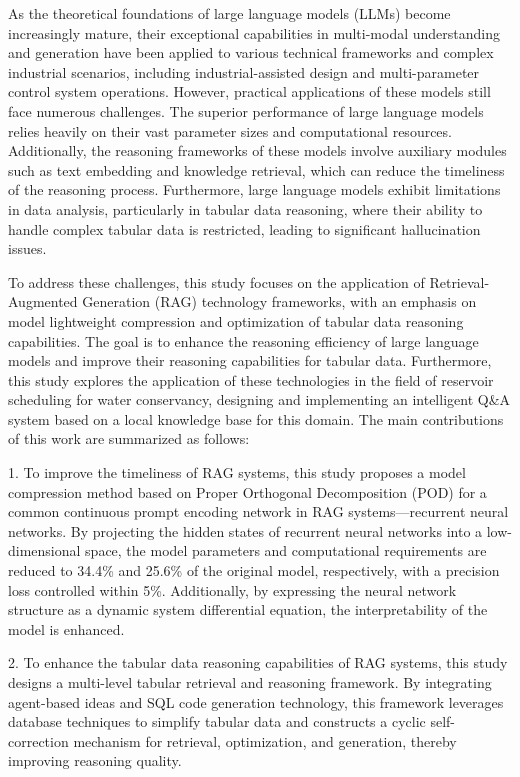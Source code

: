     \begin{eabstract}
        As the theoretical foundations of large language models (LLMs) become increasingly mature, their exceptional capabilities in multi-modal understanding and generation have been applied to various technical frameworks and complex industrial scenarios, including industrial-assisted design and multi-parameter control system operations. However, practical applications of these models still face numerous challenges. The superior performance of large language models relies heavily on their vast parameter sizes and computational resources. Additionally, the reasoning frameworks of these models involve auxiliary modules such as text embedding and knowledge retrieval, which can reduce the timeliness of the reasoning process. Furthermore, large language models exhibit limitations in data analysis, particularly in tabular data reasoning, where their ability to handle complex tabular data is restricted, leading to significant hallucination issues. 

        To address these challenges, this study focuses on the application of Retrieval-Augmented Generation (RAG) technology frameworks, with an emphasis on model lightweight compression and optimization of tabular data reasoning capabilities. The goal is to enhance the reasoning efficiency of large language models and improve their reasoning capabilities for tabular data. Furthermore, this study explores the application of these technologies in the field of reservoir scheduling for water conservancy, designing and implementing an intelligent Q\&A system based on a local knowledge base for this domain. The main contributions of this work are summarized as follows:

        1. To improve the timeliness of RAG systems, this study proposes a model compression method based on Proper Orthogonal Decomposition (POD) for a common continuous prompt encoding network in RAG systems—recurrent neural networks. By projecting the hidden states of recurrent neural networks into a low-dimensional space, the model parameters and computational requirements are reduced to 34.4\% and 25.6\% of the original model, respectively, with a precision loss controlled within 5\%. Additionally, by expressing the neural network structure as a dynamic system differential equation, the interpretability of the model is enhanced.

        2. To enhance the tabular data reasoning capabilities of RAG systems, this study designs a multi-level tabular retrieval and reasoning framework. By integrating agent-based ideas and SQL code generation technology, this framework leverages database techniques to simplify tabular data and constructs a cyclic self-correction mechanism for retrieval, optimization, and generation, thereby improving reasoning quality.


\end{eabstract}

